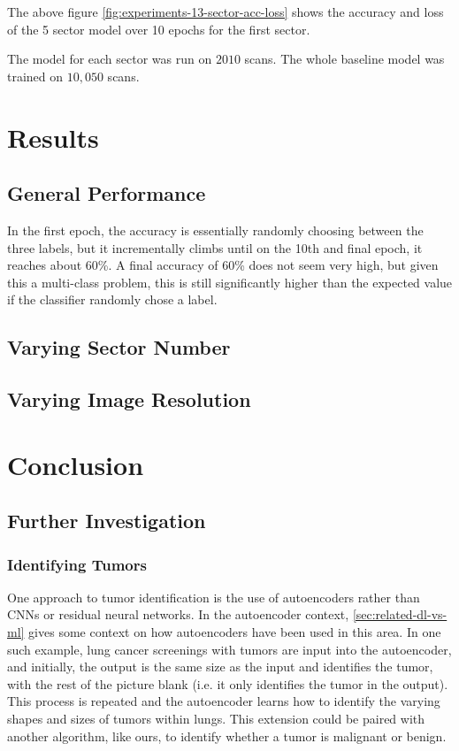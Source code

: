 \documentclass[10pt,twocolumn,letterpaper]{article}
\begin{document}
      The above figure \ref{fig:experiments-13-sector-acc-loss} shows the accuracy and loss of the 5 sector model over 10 epochs for the first sector.

      The model for each sector was run on $2010$ scans. The whole baseline model was trained on $10,050$ scans.
\section{Results} \label{sec:results}

   \subsection{General Performance} \label{sec:experiments-general-performance}

      In the first epoch, the accuracy is essentially randomly choosing between the three labels, but it incrementally climbs until on the 10th and final epoch, it reaches about 60\%. A final accuracy of 60\% does not seem very high, but given this a multi-class problem, this is still significantly higher than the expected value if the classifier randomly chose a label. 
   \subsection{Varying Sector Number} \label{sec:experiments-sector}


   \subsection{Varying Image Resolution} \label{sec:experiements-res}

\section{Conclusion} \label{sec:conclusion}

   \subsection{Further Investigation} \label{sec:further}

      \subsubsection{Identifying Tumors} \label{sec:id-tumor}
    
         One approach to tumor identification is the use of autoencoders rather than CNNs or residual neural networks. In the autoencoder context, \ref{sec:related-dl-vs-ml} gives some context on how autoencoders have been used in this area. In one such example, lung cancer screenings with tumors are input into the autoencoder, and initially, the output is the same size as the input and identifies the tumor, with the rest of the picture blank (i.e. it only identifies the tumor in the output). This process is repeated and the autoencoder learns how to identify the varying shapes and sizes of tumors within lungs. This extension could be paired with another algorithm, like ours, to identify whether a tumor is malignant or benign. 
    
\end{document}

